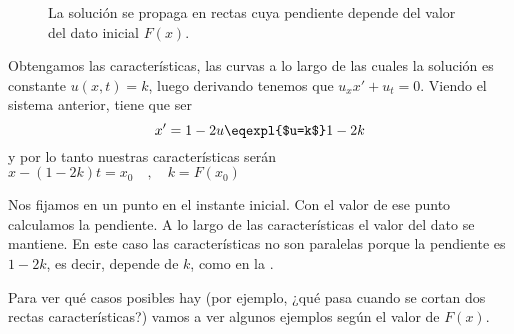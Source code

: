 		\begin{wrapfigure}{R}{0.4\textwidth}
			\centering
			\vspace{-15pt}
			\vspace{-15pt}
			\caption{La solución se propaga en rectas cuya pendiente depende del valor del dato inicial $F(x)$.}
			\label{fig:rectasDivergentes}
		\end{wrapfigure}

		Obtengamos las características, las curvas a lo largo de las cuales la solución es constante ${u(x,t) = k}$, luego derivando tenemos que ${u_x x' + u_t = 0}$. Viendo el sistema anterior, tiene que ser
		\[ x' = 1 - 2u \eqexpl{$u=k$} 1 - 2k \] y por lo tanto nuestras características serán
		\( x - (1-2k)t = x_0\quad,\quad k=F(x_0)  \label{eq:caracteristicas_realistas} \)

		Nos fijamos en un punto en el instante inicial. Con el valor de ese punto calculamos la pendiente. A lo largo de las características el valor del dato se mantiene. En este caso las características no son paralelas porque la pendiente es $1-2k$, es decir, depende de $k$, como en la .

		Para ver qué casos posibles hay (por ejemplo, ¿qué pasa cuando se cortan dos rectas características?) vamos a ver algunos ejemplos según el valor de $F(x)$.

